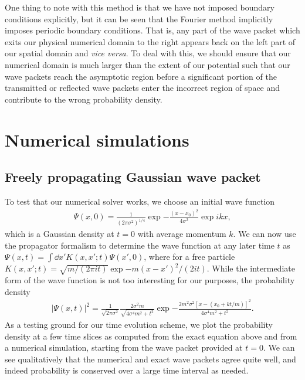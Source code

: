 One thing to note with this method is that we have not imposed boundary conditions explicitly, but it can be seen that the Fourier method implicitly imposes periodic boundary conditions.
That is, any part of the wave packet which exits our physical numerical domain to the right appears back on the left part of our spatial domain and \textit{vice versa}.
To deal with this, we should ensure that our numerical domain is much larger than the extent of our potential such that our wave packets reach the asymptotic region before a significant portion of the transmitted or reflected wave packets enter the incorrect region of space and contribute to the wrong probability density.


\section{Numerical simulations}
\label{sec:numerical-simulations}

\subsection{Freely propagating Gaussian wave packet}
\label{ssec:freely-propagating-gaussian-wave-packet}

To test that our numerical solver works, we choose an initial wave function
\begin{align}
    \Psi(x,0) = \frac{1}{(2 \pi \sigma^2)^{1/4}} \exp{-\frac{(x - x_{0})^2}{4 \sigma^2}} \exp{i k x}
,\end{align}
which is a Gaussian density at $t = 0$ with average momentum $k$.
We can now use the propagator formalism to determine the wave function at any later time $t$ as $\Psi(x,t) = \int \dd{x'} K(x,x';t) \Psi(x',0)$, where for a free particle $K(x,x';t) = \sqrt{m/(2 \pi i t)} \exp{-m(x - x')^2/(2it)}$.
While the intermediate form of the wave function is not too interesting for our purposes, the probability density
\begin{align}
    |\Psi(x,t)|^2 = \frac{1}{\sqrt{2 \pi \sigma^2}} \frac{2 \sigma^2 m}{\sqrt{ 4 \sigma^4 m^2 + t^2 }} \exp{ -\frac{2 m^2 \sigma^2 [ x - (x_0 + k t / m) ]^2}{4 \sigma^{4} m^2 + t^2} }
.\end{align}
As a testing ground for our time evolution scheme, we plot the probability density at a few time slices as computed from the exact equation above and from a numerical simulation, starting from the wave packet provided at $t = 0$.
We can see qualitatively that the numerical and exact wave packets agree quite well, and indeed probability is conserved over a large time interval as needed.


